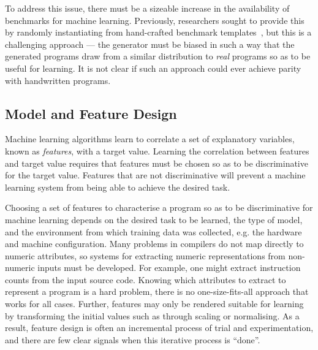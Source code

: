 To address this issue, there must be a sizeable increase in the availability of benchmarks for machine learning. Previously, researchers sought to provide this by randomly instantiating from hand-crafted benchmark templates~\cite{Chiu2015}, but this is a challenging approach --- the generator must be biased in such a way that the generated programs draw from a similar distribution to \emph{real} programs so as to be useful for learning. It is not clear if such an approach could ever achieve parity with handwritten programs.

\subsection{Model and Feature Design}
\label{subsec:challenge-features}

Machine learning algorithms learn to correlate a set of explanatory variables, known as \emph{features}, with a target value. Learning the correlation between features and target value requires that features must be chosen so as to be discriminative for the target value. Features that are not discriminative will prevent a machine learning system from being able to achieve the desired task.

Choosing a set of features to characterise a program so as to be discriminative for machine learning  depends on the desired task to be learned, the type of model, and the environment from which training data was collected, e.g. the hardware and machine configuration. Many problems in compilers do not map directly to numeric attributes, so systems for extracting numeric representations from non-numeric inputs must be developed. For example, one might extract instruction counts from the input source code. Knowing which attributes to extract to represent a program is a hard problem, there is no one-size-fits-all approach that works for all cases. Further, features may only be rendered suitable for learning by transforming the initial values such as through scaling or normalising. As a result, feature design is often an incremental process of trial and experimentation, and there are few clear signals when this iterative process is ``done''.

